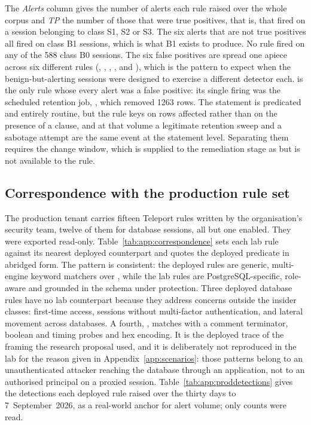 The \emph{Alerts} column gives the number of alerts each rule raised over the whole
corpus and \emph{TP} the number of those that were true positives, that is, that fired
on a session belonging to class S1, S2 or S3. The six alerts that are not true
positives all fired on class B1 sessions, which is what B1 exists to produce. No rule
fired on any of the \num{588} class B0 sessions. The six false positives are spread
one apiece across six different rules (, ,
, ,  and ),
which is the pattern to expect when the benign-but-alerting sessions were designed to
exercise a different detector each.  is the only rule whose every
alert was a false positive: its single firing was the scheduled retention job,
, which
removed \num{1263} rows. The statement is predicated and entirely routine, but the
rule keys on rows affected rather than on the presence of a  clause, and
at that volume a legitimate retention sweep and a sabotage attempt are the same event
at the statement level. Separating them requires the change window, which is supplied
to the remediation stage as  but is not available to the rule.

\subsection{Correspondence with the production rule set}
\label{app:rules:production}

The production tenant carries fifteen Teleport rules written by the organisation's
security team, twelve of them for database sessions, all but one enabled. They were
exported read-only. Table~\ref{tab:app:correspondence} sets each lab rule against its
nearest deployed counterpart and quotes the deployed predicate in abridged form. The
pattern is consistent: the deployed rules are generic, multi-engine keyword matchers
over , while the lab rules are PostgreSQL-specific,
role-aware and grounded in the schema under protection. Three deployed database rules
have no lab counterpart because they address concerns outside the insider classes:
first-time access, sessions without multi-factor authentication, and lateral movement
across databases. A fourth, , matches
 with a comment terminator, boolean and timing probes and hex
encoding. It is the deployed trace of the framing the research proposal used, and it
is deliberately not reproduced in the lab for the reason given in
Appendix~\ref{app:scenarios}: those patterns belong to an unauthenticated attacker
reaching the database through an application, not to an authorised principal on a
proxied session. Table~\ref{tab:app:proddetections} gives the detections each deployed
rule raised over the thirty days to 7~September~2026, as a real-world anchor for alert
volume; only counts were read.

